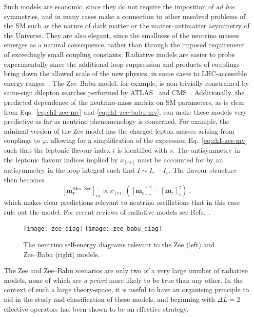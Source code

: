 Such models are economic, since they do not require the imposition of \textit{ad
  hoc} symmetries, and in many cases make a connection to other unsolved
problems of the SM such as the nature of dark matter or the matter--antimatter
asymmetry of the Universe. They are also elegant, since the smallness of the
neutrino masses emerges as a natural consequence, rather than through the
imposed requirement of exceedingly small coupling constants. Radiative models
are easier to probe experimentally since the additional loop suppression and
products of couplings bring down the allowed scale of the new physics, in some
cases to LHC-accessible energy ranges~\cite{deGouvea:2007qla}. The Zee--Babu
model, for example, is non-trivially constrained by same-sign dilepton searches
performed by ATLAS~\cite{ATLAS:2012hi, ATLAS:2014kca, Aaboud:2017qph} and
CMS~\cite{Chatrchyan:2012ya, CMS:2016cpz, CMS:2017pet}. Additionally, the
predicted dependence of the neutrino-mass matrix on SM parameters, as is clear
from Eqs.~\eqref{eq:ch1-zee-mv} and \eqref{eq:ch1-zee-babu-mv}, can make these models
very predictive as far as neutrino phenomenology is concerned. For example, the
minimal version of the Zee model has the charged-lepton masses arising from
couplings to $\varphi$, allowing for a simplification of the expression
Eq.~\eqref{eq:ch1-zee-mv} such that the leptonic flavour index $t$ is identified
with $s$. The antisymmetry in the leptonic flavour indices implied by $x_{[rs]}$
must be accounted for by an antisymmetry in the loop integral such that
$I \sim I_{r} - I_{s}$. The flavour structure then
becomes~\cite{Wolfenstein:1980sy}
\begin{equation}
  \label{eq:ch1-zee-wolfenstein-mv}
  [\mathbf{m}_{\nu}^{\text{Min. Zee}}]_{rs} \propto x_{[rs]} ([\mathbf{m}_{e}]_{r}^{2} - [\mathbf{m}_{e}]_{s}^{2}) \ ,
\end{equation}
which makes clear predictions relevant to neutrino oscillations that in this
case rule out the model. For recent reviews of radiative models see
Refs.~\cite{Boucenna:2014zba, Cai:2017jrq}.

\begin{figure}[t]
  \centering
  \texttt{[image: zee\_diag]}
  \texttt{[image: zee\_babu\_diag]}
  \caption{The neutrino self-energy diagrams relevant to the Zee (left) and
    Zee--Babu (right) models.}
  \label{fig:ch1-zee-and-zee-babu-diags}
\end{figure}

The Zee and Zee--Babu scenarios are only two of a very large number of radiative
models, none of which are \textit{a priori} more likely to be true than any
other. In the context of such a large theory-space, it is useful to have an
organising principle to aid in the study and classification of these models, and
beginning with $\Delta L = 2$ effective operators has been shown to be an
effective strategy.

